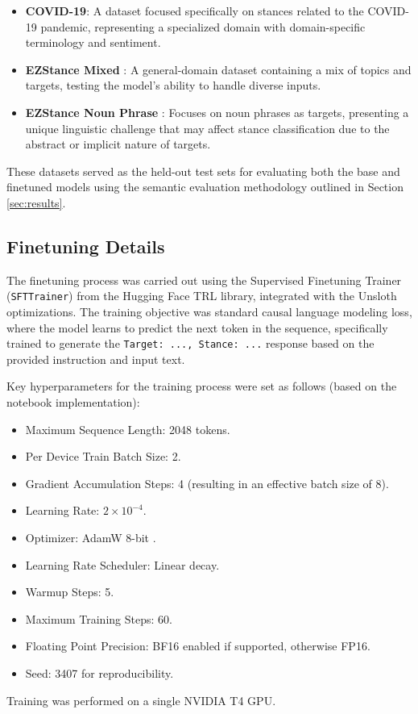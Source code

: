\documentclass[twocolumn,11pt,letterpaper]{article}
\begin{document}
\begin{itemize}
    \item \textbf{COVID-19}: A dataset focused specifically on stances related to the COVID-19 pandemic, representing a specialized domain with domain-specific terminology and sentiment.
    \item \textbf{EZStance Mixed} \cite{akash2024}: A general-domain dataset containing a mix of topics and targets, testing the model's ability to handle diverse inputs.
    \item \textbf{EZStance Noun Phrase} \cite{akash2024}: Focuses on noun phrases as targets, presenting a unique linguistic challenge that may affect stance classification due to the abstract or implicit nature of targets.
\end{itemize}
These datasets served as the held-out test sets for evaluating both the base and finetuned models using the semantic evaluation methodology outlined in Section \ref{sec:results}.

\subsection{Finetuning Details}
\label{sec:finetuning}

The finetuning process was carried out using the Supervised Finetuning Trainer (\texttt{SFTTrainer}) from the Hugging Face TRL library, integrated with the Unsloth optimizations. The training objective was standard causal language modeling loss, where the model learns to predict the next token in the sequence, specifically trained to generate the \texttt{Target: ..., Stance: ...} response based on the provided instruction and input text.

Key hyperparameters for the training process were set as follows (based on the notebook implementation):
\begin{itemize}
    \item Maximum Sequence Length: 2048 tokens.
    \item Per Device Train Batch Size: 2.
    \item Gradient Accumulation Steps: 4 (resulting in an effective batch size of 8).
    \item Learning Rate: $2 \times 10^{-4}$.
    \item Optimizer: AdamW 8-bit \cite{adamw8bit}.
    \item Learning Rate Scheduler: Linear decay.
    \item Warmup Steps: 5.
    \item Maximum Training Steps: 60. 
    \item Floating Point Precision: BF16 enabled if supported, otherwise FP16.
    \item Seed: 3407 for reproducibility.
\end{itemize}
Training was performed on a single NVIDIA T4 GPU.
\end{document}
